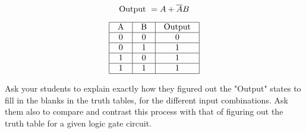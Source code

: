 \vskip 20pt


$$\hbox{Output } = A + \overline{A}B$$

$$\vbox{\offinterlineskip
\halign{\strut
\vrule \quad\hfil # \ \hfil & 
\vrule \quad\hfil # \ \hfil & 
\vrule \quad\hfil # \ \hfil \vrule \cr
\noalign{\hrule}
%
A & B & Output \cr
%
\noalign{\hrule}
%
0 & 0 & 0 \cr
%
\noalign{\hrule}
%
0 & 1 & 1 \cr
%
\noalign{\hrule}
%
1 & 0 & 1 \cr
%
\noalign{\hrule}
%
1 & 1 & 1 \cr
%
\noalign{\hrule}
} %
}$$ %







Ask your students to explain exactly how they figured out the "Output" states to fill in the blanks in the truth tables, for the different input combinations.  Ask them also to compare and contrast this process with that of figuring out the truth table for a given logic gate circuit.




